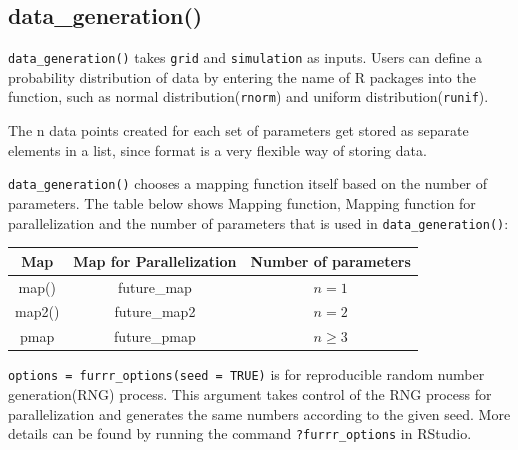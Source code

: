 \documentclass[11pt,a4paper]{article}
\begin{document}
\hypertarget{data_generation}{%
\subsection{data\_generation()}\label{data_generation}}

\texttt{data\_generation()} takes \texttt{grid} and \texttt{simulation}
as inputs. Users can define a probability distribution of data by
entering the name of R packages into the function, such as normal
distribution(\texttt{rnorm}) and uniform distribution(\texttt{runif}).

The n data points created for each set of parameters get stored as
separate elements in a list, since format is a very flexible way of
storing data.

\texttt{data\_generation()} chooses a mapping function itself based on
the number of parameters. The table below shows Mapping function,
Mapping function for parallelization and the number of parameters that
is used in \texttt{data\_generation()}:

\begin{longtable}[]{@{}ccc@{}}
\toprule()
Map & Map for Parallelization & Number of parameters \\
\midrule()
\endhead
map() & future\_map & \(n = 1\) \\
map2() & future\_map2 & \(n = 2\) \\
pmap & future\_pmap & \(n \geq 3\) \\
\bottomrule()
\end{longtable}

\texttt{options\ =\ furrr\_options(seed\ =\ TRUE)} is for reproducible
random number generation(RNG) process. This argument takes control of
the RNG process for parallelization and generates the same numbers
according to the given seed. More details can be found by running the
command \texttt{?furrr\_options} in RStudio.
\end{document}
